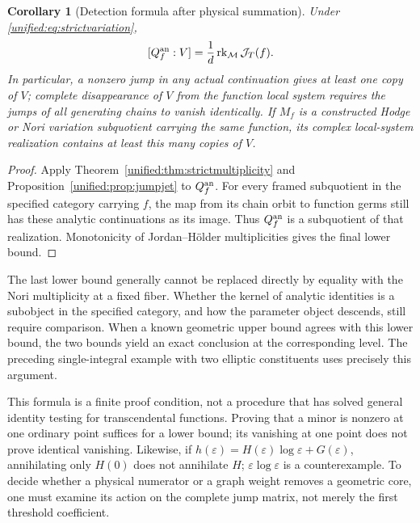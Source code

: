 \documentclass[11pt,a4paper,oneside]{article}
\theoremstyle{plain}
\newtheorem{corollary}[theorem]{Corollary}
\theoremstyle{definition}
\theoremstyle{remark}
\numberwithin{equation}{section}
\begin{document}
\begin{corollary}[Detection formula after physical summation]\label{unified:cor:physicalmultiplicity}
Under \eqref{unified:eq:strictvariation},
\begin{equation}\label{unified:eq:functionmultiplicity}
 [Q_f^{\rm an}:V]=\frac{1}{d}\operatorname{rk}_{\mathcal M}\mathcal J_T(f).
\end{equation}
In particular, a nonzero jump in any actual continuation gives at least one copy of $V$;
complete disappearance of $V$ from the function local system requires the jumps of all generating chains to vanish identically.
If $M_f$ is a constructed Hodge or Nori variation subquotient carrying the same function,
its complex local-system realization contains at least this many copies of $V$.
\end{corollary}
\begin{proof}
Apply Theorem~\ref{unified:thm:strictmultiplicity} and
Proposition~\ref{unified:prop:jumpjet} to $Q_f^{\rm an}$. For every framed subquotient in the specified category carrying $f$, the map from its chain orbit to function germs
still has these analytic continuations as its image. Thus $Q_f^{\rm an}$ is a subquotient of that realization.
Monotonicity of Jordan--Hölder multiplicities gives the final lower bound.
\end{proof}

The last lower bound generally cannot be replaced directly by equality with the Nori multiplicity at a fixed fiber.
Whether the kernel of analytic identities is a subobject in the specified category, and how the parameter object descends, still require comparison.
When a known geometric upper bound agrees with this lower bound, the two bounds yield an exact conclusion at the corresponding level.
The preceding single-integral example with two elliptic constituents uses precisely this argument.

This formula is a finite proof condition, not a procedure that has solved general identity testing for transcendental functions.
Proving that a minor is nonzero at one ordinary point suffices for a lower bound; its vanishing at one point does not prove identical vanishing.
Likewise, if $h(\varepsilon)=H(\varepsilon)\log\varepsilon+G(\varepsilon)$,
annihilating only $H(0)$ does not annihilate $H$; $\varepsilon\log\varepsilon$ is a counterexample.
To decide whether a physical numerator or a graph weight removes a geometric core, one must examine its action on the complete jump matrix,
not merely the first threshold coefficient.
\end{document}
